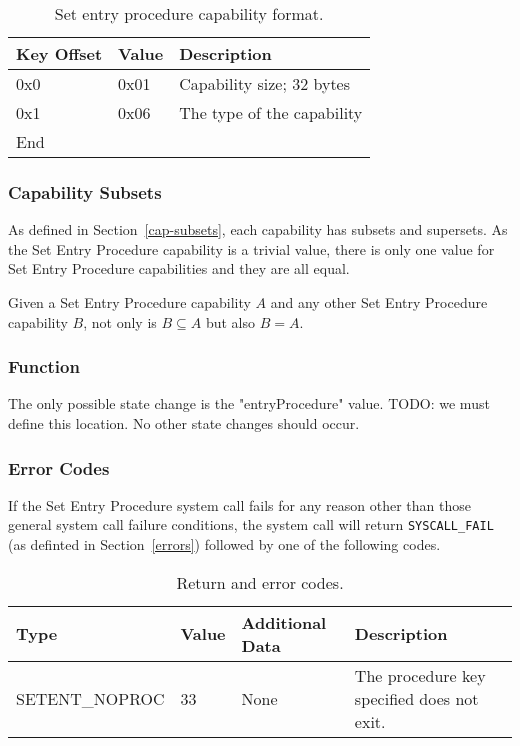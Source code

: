 \documentclass[english,a4paper]{article}
\let\oldparagraph\subsubsection
\renewcommand{\subsubsection}[1]{\oldparagraph{#1}\mbox{}}
\begin{document}
\begin{table}[H]
  \caption{Set entry procedure capability format.}
  \centering{}%
  \begin{tabular}{l|l|p{}}
    \hline
    Key Offset & Value & Description\tabularnewline
    \hline
    \hline
    0x0 & 0x01 & Capability size; 32 bytes \tabularnewline
    0x1 & 0x06 & The type of the capability \tabularnewline
    \hline
    End &  \tabularnewline
    \hline
  \end{tabular}
\end{table}

\subsubsection{Capability Subsets}
As defined in Section~\ref{cap-subsets}, each capability has subsets and
supersets. As the Set Entry Procedure capability is a trivial value, there is
only one value for Set Entry Procedure capabilities and they are all equal.

Given a Set Entry Procedure capability $A$ and any other Set Entry Procedure
capability $B$, not only is $B \subseteq A$ but also $B = A$.

\subsubsection{Function}
The only possible state change is the "entryProcedure" value. TODO: we must
define this location. No other state changes should occur.

\subsubsection{Error Codes}
If the Set Entry Procedure system call fails for any reason other than those
general system call failure conditions, the system call will return
\texttt{SYSCALL\_FAIL} (as definted in Section~\ref{errors}) followed by one of
the following codes.

\begin{table}[H]
  \caption{Return and error codes.}
  \centering{}%
  \begin{tabular}{l|l|p{}|p{}}
    \hline
    Type & Value & Additional Data & Description\tabularnewline
    \hline
    \hline
    SETENT\_NOPROC  & 33 & None & The procedure key specified does not exit.
      \tabularnewline
    \hline
  \end{tabular}
\end{table}
\end{document}
